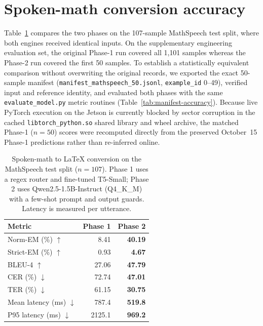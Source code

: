 \documentclass[11pt,a4paper,oneside]{report}
\theoremstyle{definition}
\newcommand{\code}[1]{\texttt{\small #1}}
\begin{document}
\section{Spoken-math conversion accuracy}
\label{sec:res-accuracy}
Table~\ref{tab:accuracy} compares the two phases on the 107-sample MathSpeech test split, where both engines received identical inputs. On the supplementary engineering evaluation set, the original Phase-1 run covered all 1{,}101 samples whereas the Phase-2 run covered the first 50 samples. To establish a statistically equivalent comparison without overwriting the original records, we exported the exact 50-sample manifest (\code{manifest\_mathspeech\_50.jsonl}, \code{example\_id} 0--49), verified input and reference identity, and evaluated both phases with the same \code{evaluate\_model.py} metric routines (Table~\ref{tab:manifest-accuracy}). Because live PyTorch execution on the Jetson is currently blocked by sector corruption in the cached \code{libtorch\_python.so} shared library and wheel archive, the matched Phase-1 ($n=50$) scores were recomputed directly from the preserved October~15 Phase-1 predictions rather than re-inferred online.

\begin{table}[ht]
\centering\small
\caption{Spoken-math to LaTeX conversion on the MathSpeech test split ($n=107$). Phase 1 uses a regex router and fine-tuned T5-Small; Phase 2 uses Qwen2.5-1.5B-Instruct (Q4\_K\_M) with a few-shot prompt and output guards. Latency is measured per utterance.}
\label{tab:accuracy}
\begin{tabular}{@{}lrr@{}}
\toprule
\textbf{Metric} & \textbf{Phase 1} & \textbf{Phase 2} \\
\midrule
Norm-EM (\%) $\uparrow$ & 8.41 & \textbf{40.19} \\
Strict-EM (\%) $\uparrow$ & 0.93 & \textbf{4.67} \\
BLEU-4 $\uparrow$ & 27.06 & \textbf{47.79} \\
CER (\%) $\downarrow$ & 72.74 & \textbf{47.01} \\
TER (\%) $\downarrow$ & 61.15 & \textbf{30.75} \\
Mean latency (ms) $\downarrow$ & 787.4 & \textbf{519.8} \\
P95 latency (ms) $\downarrow$ & 2125.1 & \textbf{969.2} \\
\bottomrule
\end{tabular}
\end{table}
\end{document}
